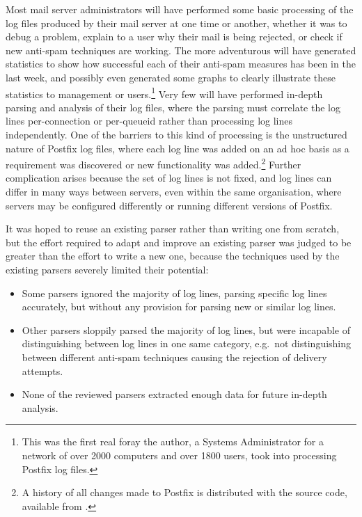 Most mail server administrators will have performed some basic processing
of the log files produced by their mail server at one time or another,
whether it was to debug a problem, explain to a user why their mail is
being rejected, or check if new anti-spam techniques are working.  The more
adventurous will have generated statistics to show how successful each of
their anti-spam measures has been in the last week, and possibly even
generated some graphs to clearly illustrate these statistics to management
or users.\footnote{This was the first real foray the author, a Systems
Administrator for a network of over 2000 computers and over 1800 users,
took into processing Postfix log files.}  Very few will have performed
in-depth parsing and analysis of their log files, where the parsing must
correlate the log lines per-connection or per-queueid rather than
processing log lines independently.  One of the barriers to this kind of
processing is the unstructured nature of Postfix log files, where each log
line was added on an ad hoc basis as a requirement was discovered or new
functionality was added.\footnote{A history of all changes made to Postfix
is distributed with the source code, available from
.}  Further
complication arises because the set of log lines is not fixed, and log
lines can differ in many ways between servers, even within the same
organisation, where servers may be configured differently or running
different versions of Postfix.

It was hoped to reuse an existing parser rather than writing one from
scratch, but the effort required to adapt and improve an existing parser
was judged to be greater than the effort to write a new one, because the
techniques used by the existing parsers severely limited their potential:

\begin{itemize}

    \item Some parsers ignored the majority of log lines, parsing specific
        log lines accurately, but without any provision for parsing new or
        similar log lines.

    \item Other parsers sloppily parsed the majority of log lines, but were
        incapable of distinguishing between log lines in one same category,
        e.g.\ not distinguishing between different anti-spam techniques
        causing the rejection of delivery attempts.

    \item None of the reviewed parsers extracted enough data for future
        in-depth analysis.

\end{itemize}

